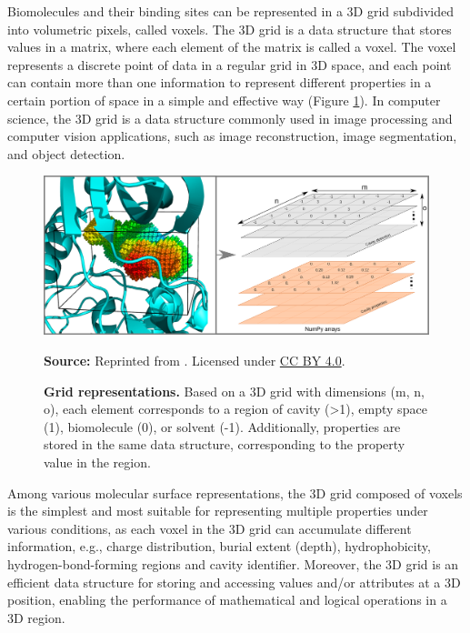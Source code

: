 \documentclass[Ingles]{phdthesis}
\def\eg{e.g.\onedot}
\begin{document}
Biomolecules and their binding sites can be represented in a 3D grid subdivided into volumetric pixels, called voxels. The 3D grid is a data structure that stores values in a matrix, where each element of the matrix is called a voxel. The voxel represents a discrete point of data in a regular grid in 3D space, and each point can contain more than one information to represent different properties in a certain portion of space in a simple and effective way (Figure \ref{fig:voxel}). In computer science, the 3D grid is a data structure commonly used in image processing and computer vision applications, such as image reconstruction, image segmentation, and object detection. 

\begin{figure}[ht]
  \centerline{\includegraphics[scale=1]{images/voxels.png}}
  \centerline{\tiny{\textbf{Source:} Reprinted from \cite{guerra2021}. Licensed under \href{https://creativecommons.org/licenses/by/4.0/}{CC BY 4.0}.}}
  \caption[Grid representations]{\textbf{Grid representations.} Based on a 3D grid with dimensions (m, n, o), each element corresponds to a region of cavity (>1), empty space (1), biomolecule (0), or solvent (-1). Additionally, properties are stored in the same data structure, corresponding to the property value in the region.}
  \label{fig:voxel}
\end{figure}

Among various molecular surface representations, the 3D grid composed of voxels is the simplest and most suitable for representing multiple properties under various conditions, as each voxel in the 3D grid can accumulate different information, \eg, charge distribution, burial extent (depth), hydrophobicity, hydrogen-bond-forming regions and cavity identifier. Moreover, the 3D grid is an efficient data structure for storing and accessing values and/or attributes at a 3D position, enabling the performance of mathematical and logical operations in a 3D region.

\end{document}
